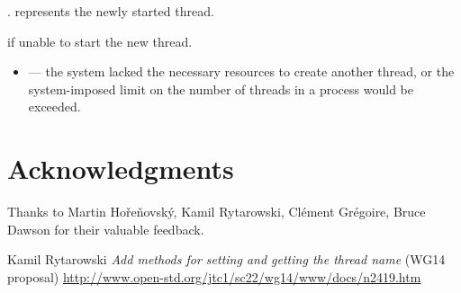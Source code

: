 \documentclass{wg21}
\begin{document}
\begin{itemdescr}
\pnum
\ensures
{}.  represents the newly started thread.

\pnum
\throws
{} if unable to start the new thread.

\pnum
\errors
\begin{itemize}
    \item {} --- the system lacked the necessary
    resources to create another thread, or the system-imposed limit on the number of
    threads in a process would be exceeded.
\end{itemize}
\end{itemdescr}



\section{Acknowledgments}

Thanks to Martin Hořeňovský, Kamil Rytarowski, Clément Grégoire, Bruce Dawson for their valuable feedback.






\renewcommand{\section}[2]{}%
\begin{thebibliography}{9}
    \nocite{N4830}
    
    Kamil Rytarowski
    \emph{Add methods for setting and getting the thread name} (WG14 proposal)\newline
    \url{http://www.open-std.org/jtc1/sc22/wg14/www/docs/n2419.htm}
\end{thebibliography}
\end{document}
